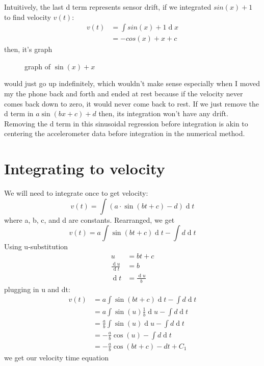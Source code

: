 \documentclass[12pt]{article}
\newcommand{\diff}{\ensuremath{\operatorname{d}\!}}
\begin{document}
Intuitively, the last d term represents sensor drift, if we integrated $sin(x) + 1$ to find velocity $v(t)$:
\begin{align}
    v(t) &= \int sin(x) + 1 \diff x \\
    &= -cos(x) + x + c
\end{align}
then, it's graph
\begin{figure}[H]
    \center
    \caption{graph of $\sin(x) + x$}
\end{figure}
would just go up indefinitely, which wouldn't make sense especially when I moved my the phone back and forth and ended at rest because if the velocity never comes back down to zero, it would never come back to rest. If we just remove the d term in $a\sin(bx+c) + d$ then, its integration won't have any drift. Removing the d term in this sinusoidal regression before integration is akin to centering the accelerometer data before integration in the numerical method.

\section{Integrating to velocity}
We will need to integrate once to get velocity:
\begin{equation}
    v(t) = \int \left(a\cdot\sin\left(bt+c\right)-d\right)\diff t
\end{equation}
where a, b, c, and d are constants. Rearranged, we get
\begin{equation}
    v(t) = a \int \sin(bt+c)\diff t - \int d \diff t
\end{equation}
Using u-substitution
\begin{align}
    u &= bt+c \\
    \frac{\diff u}{\diff t} &= b \\
    \diff t &= \frac{\diff u}{b}
\end{align}
plugging in u and dt:
\begin{align}
    v(t) &= a \int \sin(bt+c)\diff t - \int d \diff t \\
    &= a \int \sin(u) \frac{1}{b} \diff u - \int d \diff t \\
    &= \frac{a}{b}\int \sin(u)  \diff u - \int d \diff t \\
    &= -\frac{a}{b}\cos(u) - \int d \diff t \\
    &= -\frac{a}{b}\cos(bt+c) - dt + C_{1}
\end{align}
we get our velocity time equation
\end{document}
